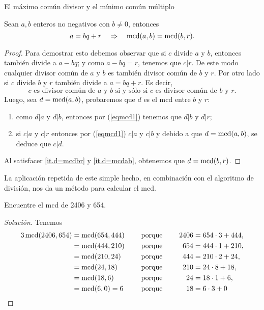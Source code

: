 \begin{section}{El máximo común divisor y el mínimo común múltiplo}
\begin{proposicion}\label{prop-alg-eucl} Sean  $a,b$ enteros no negativos con $b \not=0$, entonces 
    \begin{equation}\label{bec}
    a=bq+r\quad \Rightarrow \quad\operatorname{mcd}(a,b)=\operatorname{mcd}(b,r).
    \end{equation}
\end{proposicion}
\begin{proof}
    Para demostrar esto debemos observar que si $c$ divide $a$ y $b$, entonces también divide a $a-bq$; y como $a-bq=r$, tenemos que $c|r$. De este modo cualquier divisor común de $a$ y $b$ es también divisor común de $b$ y $r$.  Por otro lado si $c$ divide $b$ y $r$ también divide a $a=bq+r$. Es decir, 
    \begin{equation}\label{eqmcd1}
    \text{$c$ es divisor común de $a$ y $b$ si y sólo si $c$ es divisor común de $b$ y $r$.} \tag{*}
    \end{equation}
    Luego, sea $d = \operatorname{mcd}(a,b)$, probaremos que $d$ es el mcd entre $b$ y $r$:
    \begin{enumerate}[label=\textit{\alph*)}]
        \item\label{it.d=mcdbr} como $d|a$ y $d|b$, entonces por (\ref{eqmcd1}) tenemos que $ d|b$ y $d|r$;
        \item\label{it.d=mcdab} si $c|a $ y $c|r$ entonces por (\ref{eqmcd1})  $c|a$ y $c|b$ y debido a que $d = \operatorname{mcd}(a,b)$, se deduce que $c|d$.
    \end{enumerate}
    Al satisfacer \ref{it.d=mcdbr} y \ref{it.d=mcdab}, obtenemos que $d = \operatorname{mcd}(b,r)$.
\end{proof}

La aplicación repetida de este simple hecho, en combinación con el algoritmo de división, nos da un método para calcular el mcd.

\begin{ejemplo*} Encuentre el mcd de 2406 y 654.
\end{ejemplo*}
\begin{proof}[Solución] Tenemos
    \begin{alignat*}3
    \mcd(2406,654)&=\mcd(654,444)&\quad &\text{ porque }\quad& 2406&=654\cdot3+444,\\
    &=\mcd(444,210)& &\text{ porque }\quad& 654&=444\cdot1+210,\\
    &=\mcd(210,24)&& \text{ porque }\quad &444&=210\cdot2+24,\\
    &=\mcd(24,18) && \text{ porque }\quad &210&=24\cdot8+18,\\
    &=\mcd(18,6)  && \text{ porque }\quad &24 &=18\cdot1+6,\\
    & =\mcd(6,0) = 6           &&\text{ porque }\quad&18&=6\cdot3 + 0
    \end{alignat*}
    

\end{proof}
\end{section}
